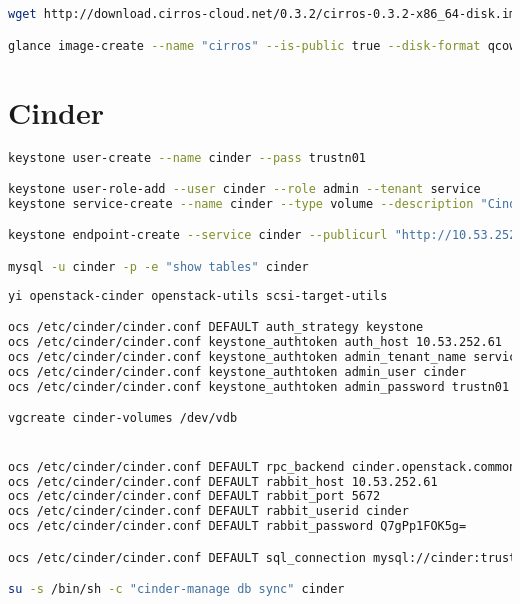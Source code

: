 \documentclass[11pt,letterpaper,oneside]{book}
\begin{document}
\begin{lstlisting}[caption={Add Cirros Image},language=bash]
wget http://download.cirros-cloud.net/0.3.2/cirros-0.3.2-x86_64-disk.img

glance image-create --name "cirros" --is-public true --disk-format qcow2 --container-format bare --file cirros-0.3.2-x86_64-disk.img 
\end{lstlisting}


\chapter{Cinder}

\begin{lstlisting}[caption={},language=bash]
keystone user-create --name cinder --pass trustn01

keystone user-role-add --user cinder --role admin --tenant service
keystone service-create --name cinder --type volume --description "Cinder Volume Service"

keystone endpoint-create --service cinder --publicurl "http://10.53.252.62:8776/v1/\$(tenant_id)s" --adminurl "http://10.53.252.62:8776/v1/\$(tenant_id)s" --internalurl "http://10.53.252.62:8776/v1/\$(tenant_id)s"

mysql -u cinder -p -e "show tables" cinder

\end{lstlisting}

\begin{lstlisting}[caption={},language=bash]
yi openstack-cinder openstack-utils scsi-target-utils

ocs /etc/cinder/cinder.conf DEFAULT auth_strategy keystone
ocs /etc/cinder/cinder.conf keystone_authtoken auth_host 10.53.252.61
ocs /etc/cinder/cinder.conf keystone_authtoken admin_tenant_name service
ocs /etc/cinder/cinder.conf keystone_authtoken admin_user cinder
ocs /etc/cinder/cinder.conf keystone_authtoken admin_password trustn01

vgcreate cinder-volumes /dev/vdb


ocs /etc/cinder/cinder.conf DEFAULT rpc_backend cinder.openstack.common.rpc.impl_kombu
ocs /etc/cinder/cinder.conf DEFAULT rabbit_host 10.53.252.61
ocs /etc/cinder/cinder.conf DEFAULT rabbit_port 5672
ocs /etc/cinder/cinder.conf DEFAULT rabbit_userid cinder
ocs /etc/cinder/cinder.conf DEFAULT rabbit_password Q7gPp1FOK5g=

ocs /etc/cinder/cinder.conf DEFAULT sql_connection mysql://cinder:trustn01@10.53.252.61/cinder

su -s /bin/sh -c "cinder-manage db sync" cinder

\end{lstlisting}
\end{document}
